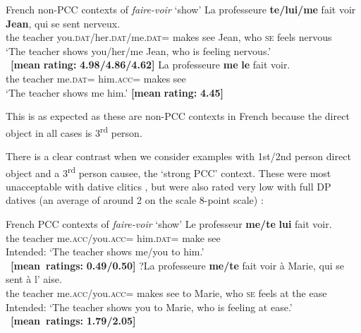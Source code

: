 \documentclass[output=paper,colorlinks,citecolor=brown,nonflat]{./langscibook}
\begin{document}
\ea%
    \label{ex:sheehan:24}
    French non-PCC contexts of \textit{faire-voir} ‘show’
    \ea\label{ex:sheehan:24a}
    \gll    La professeure \textbf{te/lui/me}  fait voir \textbf{Jean},  qui   se   sent   nerveux.\\
            the   teacher   you.\textsc{dat}/her.\textsc{dat}/me.\textsc{dat}= makes see   Jean,   who \textsc{se}   feels   nervous\\
    \glt    ‘The teacher shows you/her/me Jean, who is feeling nervous.’\\
            ~\hfill \textbf{[mean} \textbf{rating:} \textbf{4.98/4.86/4.62]}
    \ex\label{ex:sheehan:24b}
    \gll    La   professeure   \textbf{me}   \textbf{le}  fait  voir.\\
            the   teacher  me.\textsc{dat=} him.\textsc{acc=}  makes  see\\
    \glt     ‘The teacher shows me him.’ \hfill  \textbf{[mean} \textbf{rating:} \textbf{4.45]}
    \z
\z

This is as expected as these are non-PCC contexts in French because the direct object in all cases is 3\textsuperscript{rd} person. 

There is a clear contrast when we consider examples with 1st/2nd person direct object and a 3\textsuperscript{rd} person causee, the ‘strong PCC’ context. These were most unacceptable with dative clitics , but were also rated very low with full DP datives (an average of around 2 on the scale 8-point scale) :

\ea%
    \label{ex:sheehan:25}
    French PCC contexts of \textit{faire-voir} ‘show’
    \ea\label{ex:sheehan:25a}
    \gll    *Le professeur  \textbf{me/te}       \textbf{lui}   fait   voir.\\
            the   teacher  me.\textsc{acc/}you.\textsc{acc}=  him.\textsc{dat}=  make see\\
    \glt    Intended: ‘The teacher shows me/you to him.’\\
            ~\hfill \textbf{[mean~ratings:} \textbf{0.49/0.50]}
    \ex\label{ex:sheehan:25b}
    \gll    *?La   professeure   \textbf{me/te}       fait     voir à   Marie,  qui   se  sent   à   l’  aise. \\
            the     teacher     me.\textsc{acc}/you.\textsc{acc=} makes   see to Marie, who \textsc{se}   feels   at   the ease\\
    \glt    Intended: ‘The teacher shows you to Marie, who is feeling at ease.’\\
            ~\hfill \textbf{[mean~ratings:} \textbf{1.79/2.05]}
    \z
\z
\end{document}
